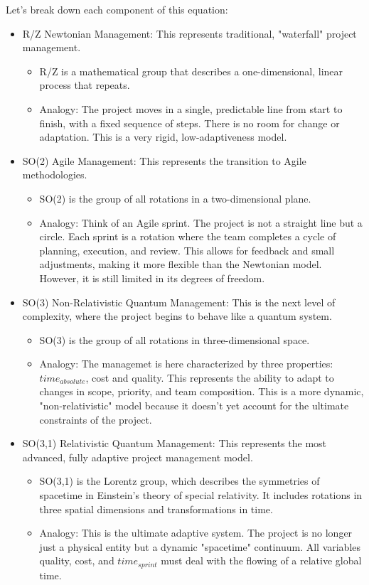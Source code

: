 \documentclass{article}
\begin{document}
Let's break down each component of this equation:
\begin{itemize}
\item R/Z Newtonian Management: This represents traditional, "waterfall" project management.
\begin{itemize}
\item R/Z is a mathematical group that describes a one-dimensional, linear process that repeats.
\item Analogy: The project moves in a single, predictable line from start to finish, with a fixed sequence of steps. There is no room for change or adaptation. This is a very rigid, low-adaptiveness model.
\end{itemize}
\item SO(2) Agile Management: This represents the transition to Agile methodologies.
\begin{itemize}
\item SO(2) is the group of all rotations in a two-dimensional plane.
\item Analogy: Think of an Agile sprint. The project is not a straight line but a circle. Each sprint is a rotation where the team completes a cycle of planning, execution, and review. This allows for feedback and small adjustments, making it more flexible than the Newtonian model. However, it is still limited in its degrees of freedom.
\end{itemize}
\item SO(3) Non-Relativistic Quantum Management: This is the next level of complexity, where the project begins to behave like a quantum system.
\begin{itemize}
\item SO(3) is the group of all rotations in three-dimensional space.
\item Analogy: The managemet is here characterized by three properties: $time_{absolute}$, cost and quality. This represents the ability to adapt to changes in scope, priority, and team composition. This is a more dynamic, "non-relativistic" model because it doesn't yet account for the ultimate constraints of the project.
\end{itemize}
\item SO(3,1) Relativistic Quantum Management: This represents the most advanced, fully adaptive project management model.
\begin{itemize}
\item SO(3,1) is the Lorentz group, which describes the symmetries of spacetime in Einstein's theory of special relativity. It includes rotations in three spatial dimensions and transformations in time.
\item Analogy: This is the ultimate adaptive system. The project is no longer just a physical entity but a dynamic "spacetime" continuum. All variables quality, cost, and $time_{sprint}$ must deal with the flowing of a relative global time.
\end{itemize}
\end{itemize}
\end{document}
